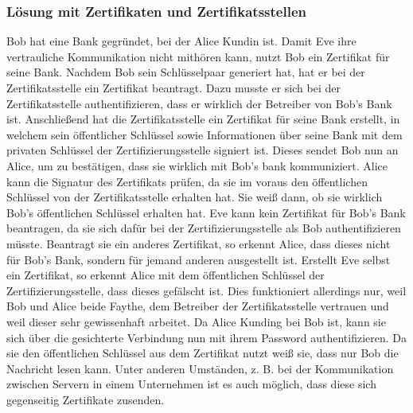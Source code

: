 \clearpage

\subsubsection{Lösung mit Zertifikaten und Zertifikatsstellen}

Bob hat eine Bank gegründet, bei der Alice Kundin ist. Damit Eve ihre vertrauliche Kommunikation
nicht mithören kann, nutzt Bob ein Zertifikat für seine Bank.
Nachdem Bob sein Schlüsselpaar generiert hat, hat er bei der Zertifikatsstelle ein Zertifikat
beantragt. Dazu musste er sich bei der Zertifikatsstelle authentifizieren, dass er
wirklich der Betreiber von Bob's Bank ist. Anschließend hat die Zertifikatsstelle ein
Zertifikat für seine Bank erstellt, in welchem sein öffentlicher Schlüssel sowie Informationen
über seine Bank mit dem privaten Schlüssel der Zertifizierungsstelle signiert ist.
Dieses sendet Bob nun an Alice, um zu bestätigen, dass sie wirklich mit Bob's bank kommuniziert.
Alice kann die Signatur des Zertifikats prüfen, da sie im voraus den öffentlichen Schlüssel
von der Zertifikatsstelle erhalten hat. Sie weiß dann, ob sie wirklich Bob's öffentlichen
Schlüssel erhalten hat. Eve kann kein Zertifikat für Bob's Bank beantragen, da sie sich
dafür bei der Zertifizierungsstelle als Bob authentifizieren müsste.
Beantragt sie ein anderes Zertifikat, so erkennt Alice, dass dieses nicht für Bob's Bank,
sondern für jemand anderen ausgestellt ist.
Erstellt Eve selbst ein Zertifikat, so erkennt Alice mit dem öffentlichen Schlüssel der
Zertifizierungsstelle, dass dieses gefälscht ist.
Dies funktioniert allerdings nur, weil Bob und Alice beide Faythe, dem Betreiber
der Zertifikatsstelle vertrauen und weil dieser sehr gewissenhaft arbeitet.
Da Alice Kunding bei Bob ist, kann sie sich über die gesichterte Verbindung nun mit ihrem
Password authentifizieren. Da sie den öffentlichen Schlüssel aus dem Zertifikat nutzt weiß sie,
dass nur Bob die Nachricht lesen kann.
Unter anderen Umständen, z. B. bei der Kommunikation zwischen Servern in einem Unternehmen
ist es auch möglich, dass diese sich gegenseitig Zertifikate zusenden.

\clearpage

\vspace*{2.5cm}

